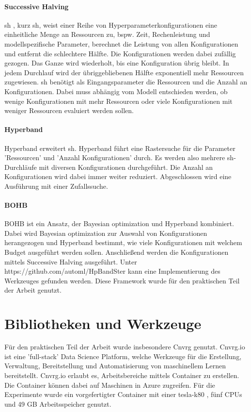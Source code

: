 	\paragraph{Successive Halving}
	\acl{sh} \cite{Jamieson.2015}, kurz \ac{sh}, weist einer Reihe von Hyperparameterkonfigurationen eine einheitliche Menge an Ressourcen zu, bspw. Zeit, Rechenleistung und modellspezifische Parameter, berechnet die Leistung von allen Konfigurationen und entfernt die schlechtere Hälfte. Die Konfigurationen werden dabei zufällig gezogen. Das Ganze wird wiederholt, bis eine Konfiguration übrig bleibt. In jedem Durchlauf wird der übriggebliebenen Hälfte exponentiell mehr Ressourcen zugewiesen. \ac{sh} benötigt als Eingangsparameter die Ressourcen und die Anzahl an Konfigurationen. Dabei muss abhängig vom Modell entschieden werden, ob wenige Konfigurationen mit mehr Ressourcen oder viele Konfigurationen mit weniger Ressourcen evaluiert werden sollen.
			
	\paragraph{Hyperband}	
	Hyperband \cite{Li.2017} erweitert \acl{sh}. Hyperband führt eine Rastersuche für die Parameter 'Ressourcen' und 'Anzahl Konfigurationen' durch. Es werden also mehrere \ac{sh}-Durchläufe mit diversen Konfigurationen durchgeführt. Die Anzahl an Konfigurationen wird dabei immer weiter reduziert. Abgeschlossen wird eine Ausführung mit einer Zufallssuche.
	
	\paragraph{BOHB}
	BOHB \cite{StefanFalkner.2018} ist ein Ansatz, der Bayesian optimization und Hyperband kombiniert. Dabei wird Bayesian optimization zur Auswahl von Konfigurationen herangezogen und Hyperband bestimmt, wie viele Konfigurationen mit welchem Budget ausgeführt werden sollen. Anschließend werden die Konfigurationen mittels Successive Halving ausgeführt. Unter https://github.com/automl/HpBandSter kann eine Implementierung des Werkzeuges gefunden werden. Diese Framework wurde für den praktischen Teil der Arbeit genutzt.
			
	\section{Bibliotheken und Werkzeuge}
	\label{sec:BibliothekenundWerkzeuge}
	Für den praktischen Teil der Arbeit wurde insbesondere Cnvrg \cite{Kolben.2020} genutzt. Cnvrg.io ist eine 'full-stack' Data Science Platform, welche Werkzeuge für die Erstellung, Verwaltung, Bereitstellung und Automatisierung von maschinellem Lernen bereitstellt. Cnvrg.io erlaubt es, Arbeitsbereiche mittels Container zu erstellen. Die Container können dabei auf Maschinen in Azure \cite{MicrosoftCorporation.2020} zugreifen. Für die Experimente wurde ein vorgefertigter Container mit einer tesla-k80 \cite{Nvidia.2020}, fünf CPUs und 49 GB Arbeitsspeicher genutzt. 

